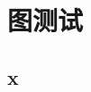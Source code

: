 

\chapter{图测试}\label{ch:break}
\section{x}\label{sec:break-overview}

\clearpage

\clearpage

\clearpage



